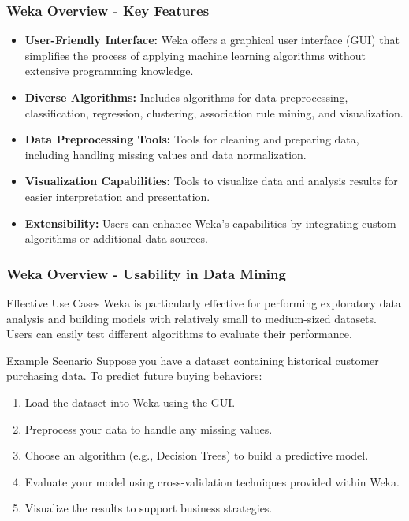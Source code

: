\documentclass[aspectratio=169]{beamer}
\begin{document}
\begin{frame}[fragile]
    \frametitle{Weka Overview - Key Features}
    \begin{itemize}
        \item \textbf{User-Friendly Interface:} 
            Weka offers a graphical user interface (GUI) that simplifies the 
            process of applying machine learning algorithms without extensive programming knowledge.

        \item \textbf{Diverse Algorithms:} 
            Includes algorithms for data preprocessing, classification, regression, clustering, 
            association rule mining, and visualization.

        \item \textbf{Data Preprocessing Tools:} 
            Tools for cleaning and preparing data, including handling missing values and 
            data normalization.

        \item \textbf{Visualization Capabilities:} 
            Tools to visualize data and analysis results for easier interpretation and presentation.

        \item \textbf{Extensibility:} 
            Users can enhance Weka's capabilities by integrating custom algorithms or additional data sources.
    \end{itemize}
\end{frame}

\begin{frame}[fragile]
    \frametitle{Weka Overview - Usability in Data Mining}
    \begin{block}{Effective Use Cases}
        Weka is particularly effective for performing exploratory data analysis 
        and building models with relatively small to medium-sized datasets. 
        Users can easily test different algorithms to evaluate their performance.
    \end{block}
    \begin{block}{Example Scenario}
        Suppose you have a dataset containing historical customer purchasing data. 
        To predict future buying behaviors: 
        \begin{enumerate}
            \item Load the dataset into Weka using the GUI.
            \item Preprocess your data to handle any missing values.
            \item Choose an algorithm (e.g., Decision Trees) to build a predictive model.
            \item Evaluate your model using cross-validation techniques provided within Weka.
            \item Visualize the results to support business strategies.
        \end{enumerate}
    \end{block}
\end{frame}
\end{document}
